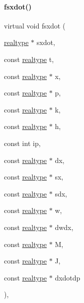 \paragraph{\texorpdfstring{fsxdot()}{fsxdot()}\hspace{0.1cm}{\footnotesize\ttfamily [3/3]}}
{\footnotesize\ttfamily virtual void fsxdot (\begin{DoxyParamCaption}\item[{\mbox{\hyperlink{namespaceamici_a1bdce28051d6a53868f7ccbf5f2c14a3}{realtype}} $\ast$}]{sxdot,  }\item[{const \mbox{\hyperlink{namespaceamici_a1bdce28051d6a53868f7ccbf5f2c14a3}{realtype}}}]{t,  }\item[{const \mbox{\hyperlink{namespaceamici_a1bdce28051d6a53868f7ccbf5f2c14a3}{realtype}} $\ast$}]{x,  }\item[{const \mbox{\hyperlink{namespaceamici_a1bdce28051d6a53868f7ccbf5f2c14a3}{realtype}} $\ast$}]{p,  }\item[{const \mbox{\hyperlink{namespaceamici_a1bdce28051d6a53868f7ccbf5f2c14a3}{realtype}} $\ast$}]{k,  }\item[{const \mbox{\hyperlink{namespaceamici_a1bdce28051d6a53868f7ccbf5f2c14a3}{realtype}} $\ast$}]{h,  }\item[{const int}]{ip,  }\item[{const \mbox{\hyperlink{namespaceamici_a1bdce28051d6a53868f7ccbf5f2c14a3}{realtype}} $\ast$}]{dx,  }\item[{const \mbox{\hyperlink{namespaceamici_a1bdce28051d6a53868f7ccbf5f2c14a3}{realtype}} $\ast$}]{sx,  }\item[{const \mbox{\hyperlink{namespaceamici_a1bdce28051d6a53868f7ccbf5f2c14a3}{realtype}} $\ast$}]{sdx,  }\item[{const \mbox{\hyperlink{namespaceamici_a1bdce28051d6a53868f7ccbf5f2c14a3}{realtype}} $\ast$}]{w,  }\item[{const \mbox{\hyperlink{namespaceamici_a1bdce28051d6a53868f7ccbf5f2c14a3}{realtype}} $\ast$}]{dwdx,  }\item[{const \mbox{\hyperlink{namespaceamici_a1bdce28051d6a53868f7ccbf5f2c14a3}{realtype}} $\ast$}]{M,  }\item[{const \mbox{\hyperlink{namespaceamici_a1bdce28051d6a53868f7ccbf5f2c14a3}{realtype}} $\ast$}]{J,  }\item[{const \mbox{\hyperlink{namespaceamici_a1bdce28051d6a53868f7ccbf5f2c14a3}{realtype}} $\ast$}]{dxdotdp }\end{DoxyParamCaption})\hspace{0.3cm}{\ttfamily [protected]}, {\ttfamily [virtual]}}

